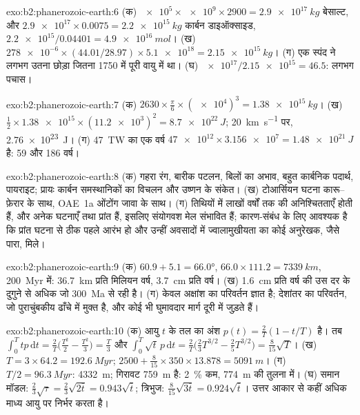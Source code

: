 \begin{solution}{exo:b2:phanerozoic-earth:6}
(क) $\num{e5} \times \num{e9} \times 2900 = \qty{2.9e17}{kg}$ बेसाल्ट, और $\num{2.9e17}
\times 0.0075 = \qty{2.2e15}{kg}$ कार्बन डाइऑक्साइड, $\num{2.2e15}/0.04401 = \qty{4.9e16}{mol}$।
(ख) $\num{278e-6} \times (44.01/28.97) \times \num{5.1e18} = \qty{2.15e15}{kg}$। (ग) एक स्पंद ने
लगभग उतना छोड़ा जितना 1750 में पूरी वायु में था। (घ) $\num{e17}/\num{2.15e15} = 46.5$: लगभग पचास।
\end{solution}

\begin{solution}{exo:b2:phanerozoic-earth:7}
(क) $2630 \times \frac{\pi}{6} \times (\num{e4})^3 = \qty{1.38e15}{kg}$। (ख) $\tfrac12 \times
\num{1.38e15} \times (\num{11.2e3})^2 = \qty{8.7e22}{J}$; \qty{20}{km.s^{-1}} पर,
\qty{2.76e23}{J}। (ग) \qty{47}{TW} का एक वर्ष $\num{47e12} \times \num{3.156e7} =
\qty{1.48e21}{J}$ है: 59 और 186 वर्ष।
\end{solution}

\begin{solution}{exo:b2:phanerozoic-earth:8}
(क) गहरा रंग, बारीक पटलन, बिलों का अभाव, बहुत कार्बनिक पदार्थ, पायराइट; प्रायः
कार्बन समस्थानिकों का विचलन और उष्णन के संकेत। (ख) टोआर्सियन घटना कारू--फ़ेरार के साथ, OAE~1a
ओंटोंग जावा के साथ। (ग) तिथियों में लाखों वर्षों तक की अनिश्चितताएँ होती हैं, और अनेक घटनाएँ तथा
प्रांत हैं, इसलिए संयोगवश मेल संभावित हैं; कारण-संबंध के लिए आवश्यक है कि प्रांत घटना से
ठीक पहले आरंभ हो और उन्हीं अवसादों में ज्वालामुखीयता का कोई अनुरेखक, जैसे पारा, मिले।
\end{solution}

\begin{solution}{exo:b2:phanerozoic-earth:9}
(क) $60.9 + 5.1 = \ang{66.0}$, $66.0 \times 111.2 = \qty{7339}{km}$, \qty{200}{Myr} में:
\qty{36.7}{km} प्रति मिलियन वर्ष, \qty{3.7}{cm} प्रति वर्ष। (ख) \qty{1.6}{cm} प्रति वर्ष की उस दर
के दुगुने से अधिक जो \qty{300}{Ma} से रही है। (ग) केवल अक्षांश का परिवर्तन ज्ञात है; देशांतर का
परिवर्तन, जो पुराचुंबकीय ढाँचे में मुक्त है, और कोई भी घुमावदार मार्ग दूरी में जुड़ते हैं।
\end{solution}

\begin{solution}{exo:b2:phanerozoic-earth:10}
(क) आयु $t$ के तल का अंश $p(t) = \frac2T(1 - t/T)$ है। तब $\int_0^T tp\,\mathrm{d}t =
\frac2T\bigl(\frac{T^2}2 - \frac{T^2}3\bigr) = \frac T3$ और $\int_0^T \sqrt t\,p\,\mathrm{d}t =
\frac2T\bigl(\frac23 T^{3/2} - \frac25 T^{3/2}\bigr) = \frac8{15}\sqrt T$। (ख) $T = 3 \times 64.2 =
\qty{192.6}{Myr}$; $2500 + \frac8{15} \times 350 \times 13.878 = \qty{5091}{m}$। (ग) $T/2 =
\qty{96.3}{Myr}$: \qty{4332}{m}; गिरावट \qty{759}{m} है:
\qty{2}{\percent} कम, \qty{774}{m} की तुलना में। (घ) समान मॉडल: $\frac23\sqrt\tau = \frac23\sqrt{2\bar t} = 0.943\sqrt{\bar t}$;
त्रिभुज: $\frac8{15}\sqrt{3\bar t} = 0.924\sqrt{\bar t}$। उत्तर आकार से कहीं अधिक माध्य आयु पर
निर्भर करता है।
\end{solution}

